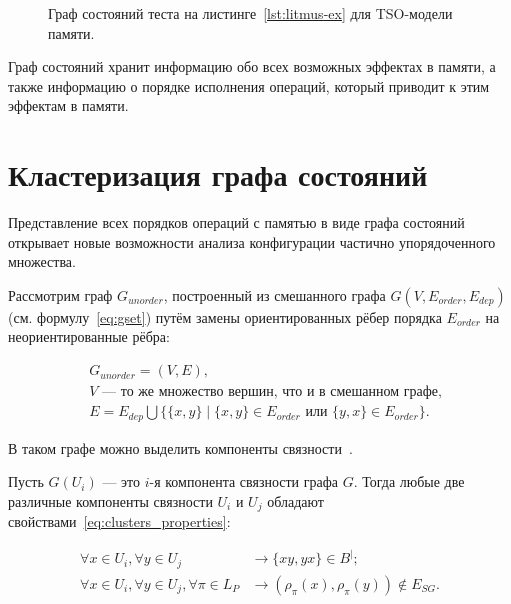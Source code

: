 \begin{figure}[ht]
  \centerfloat{
    
  }
  \caption{Граф состояний теста на листинге~\ref{lst:litmus-ex} для
  TSO-модели памяти.}
  \label{fig:sg-litmus-tso}
\end{figure}

Граф состояний хранит информацию обо всех возможных эффектах в
памяти, а также информацию о порядке исполнения операций, который
приводит к этим эффектам в памяти.

\section{Кластеризация графа состояний}
\label{sec:ch4/stategraph-cluster}

Представление всех порядков операций с памятью в виде графа состояний
открывает новые возможности анализа конфигурации частично
упорядоченного множества.

Рассмотрим граф $G_{unorder}$, построенный из
смешанного графа $G(V, E_{order}, E_{dep})$ (см. формулу~\ref{eq:gset}) путём
замены ориентированных рёбер порядка $E_{order}$ на неориентированные рёбра:

\begin{equation}
  \label{eq:unorder_set}
  \begin{aligned}
    &G_{unorder} = (V, E), \\
    &V \text{ — то же множество вершин, что и в смешанном графе,} \\
    &E = E_{dep} \bigcup \{\{x, y\} \mid \{x, y\} \in E_{order}
    \text{ или } \{y, x\} \in E_{order}\}.
  \end{aligned}
\end{equation}

В таком графе можно выделить компоненты связности~\cite{graph-theory}.

Пусть $G(U_i)$ — это $i$-я компонента связности графа $G$. Тогда
любые две различные компоненты связности $U_i$ и $U_j$ обладают
свойствами~\ref{eq:clusters_properties}:

\begin{subequations}
  \label{eq:clusters_properties}
  \begin{align}
    \forall x \in U_i, \forall y \in U_j &\rightarrow \{xy, yx\} \in
    B^{|}; \label{eq:clusters_in_equiv} \\
    \forall x \in U_i, \forall y \in U_j, \forall \pi \in L_P
    &\rightarrow (\rho_\pi(x), \rho_\pi(y)) \not \in E_{SG}.
    \label{eq:clusters_in_sg}
  \end{align}
\end{subequations}

